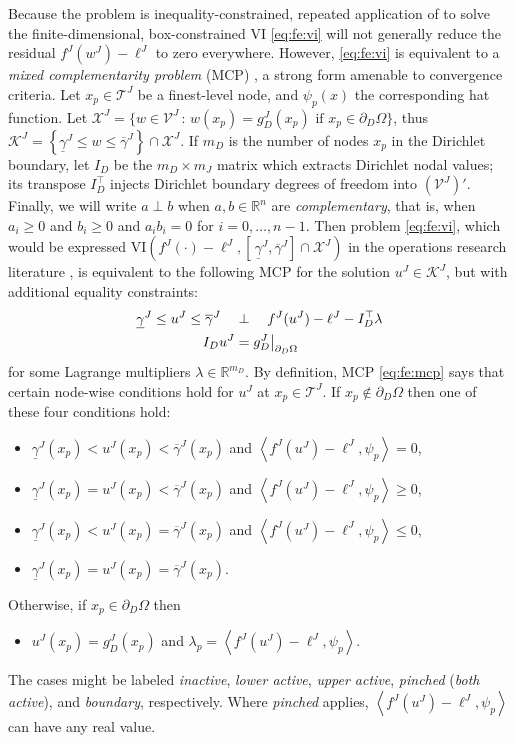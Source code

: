 \documentclass[letterpaper,final,12pt,reqno]{amsart}
\theoremstyle{cstyle}
\theoremstyle{cstyle*}
\theoremstyle{dstyle}
\numberwithin{equation}{section}
\numberwithin{figure}{section}
\numberwithin{table}{section}
\numberwithin{theorem}{section}
\newcommand{\RR}{\mathbb{R}}
\newcommand{\cK}{\mathcal{K}}
\newcommand{\cV}{\mathcal{V}}
\newcommand{\ip}[2]{\left<#1,#2\right>}
\begin{document}
Because the problem is inequality-constrained, repeated application of  to solve the finite-dimensional, box-constrained VI \eqref{eq:fe:vi} will not generally reduce the residual $f^J(w^J) - \ell^J$ to zero everywhere.  However, \eqref{eq:fe:vi} is equivalent to a \emph{mixed complementarity problem} (MCP) \cite{FacchineiPang2003}, a strong form amenable to convergence criteria.  Let $x_p \in \mathcal{T}^J$ be a finest-level node, and $\psi_p(x)$ the corresponding hat function.  Let $\mathcal{X}^J=\big\{w\in\cV^J\,:\,w(x_p)=g_D^J(x_p) \text{ if } x_p\in \partial_D\Omega\big\}$, thus $\cK^J = \left\{\underline{\gamma}^J \le w \le \overline{\gamma}^J\right\} \cap \mathcal{X}^J$.  If $m_D$ is the number of nodes $x_p$ in the Dirichlet boundary, let $I_D$ be the $m_D\times m_J$ matrix which extracts Dirichlet nodal values; its transpose $I_D^\top$ injects Dirichlet boundary degrees of freedom into $(\mathcal{V}^J)'$.  Finally, we will write $a\perp b$ when $a,b \in \RR^n$ are \emph{complementary}, that is, when $a_i \ge 0$ and $b_i \ge 0$ and $a_i b_i = 0$ for $i=0,\dots,n-1$.  Then problem \eqref{eq:fe:vi}, which would be expressed VI$\left(f^J(\cdot)-\ell^J,\left[\,\underline{\gamma}^J,\overline{\gamma}^J\right] \cap \mathcal{X}^J\right)$ in the operations research literature \cite{FerrisPang1997}, is equivalent to the following MCP for the solution $u^J \in \mathcal{K}^J$, but with additional equality constraints:
\begin{align}
\underline{\gamma}^J \le u^J \le \overline{\gamma}^J \quad &\perp \quad f^J(u^J) - \ell^J - I_D^\top \lambda \label{eq:fe:mcp} \\
I_D u^J &= g_D^J\big|_{\partial_D\Omega} \notag
\end{align}
for some Lagrange multipliers $\lambda \in \RR^{m_D}$.  By definition, MCP \eqref{eq:fe:mcp} says that certain node-wise conditions hold for $u^J$ at $x_p \in \mathcal{T}^J$.  If $x_p \notin \partial_D\Omega$ then one of these four conditions hold:
\begin{itemize}
\item $\underline{\gamma}^J(x_p)<u^J(x_p)<\overline{\gamma}^J(x_p)$ and $\ip{f^J(u^J)-\ell^J}{\psi_p} = 0$,
\item $\underline{\gamma}^J(x_p)=u^J(x_p)<\overline{\gamma}^J(x_p)$ and $\ip{f^J(u^J)-\ell^J}{\psi_p} \ge 0$,
\item $\underline{\gamma}^J(x_p)<u^J(x_p)=\overline{\gamma}^J(x_p)$ and $\ip{f^J(u^J)-\ell^J}{\psi_p} \le 0$,
\item $\underline{\gamma}^J(x_p)=u^J(x_p)=\overline{\gamma}^J(x_p)$.
\end{itemize}
Otherwise, if $x_p \in \partial_D\Omega$ then
\begin{itemize}
\item $u^J(x_p)=g_D^J(x_p)$ and $\lambda_p=\ip{f^J(u^J)-\ell^J}{\psi_p}$.
\end{itemize}
The cases might be labeled \emph{inactive}, \emph{lower active}, \emph{upper active}, \emph{pinched} (\emph{both active}), and \emph{boundary}, respectively.  Where \emph{pinched} applies, $\ip{f^J(u^J)-\ell^J}{\psi_p}$ can have any real value.
\end{document}
